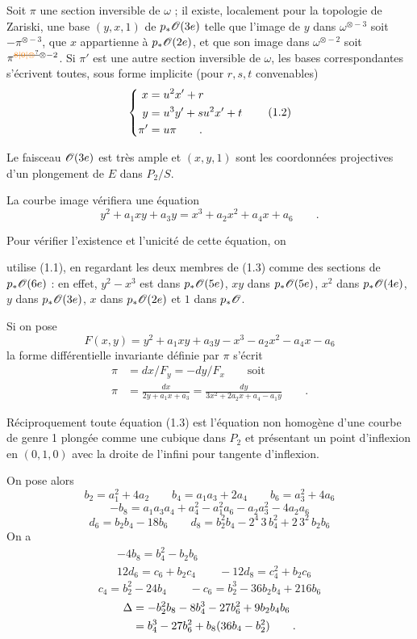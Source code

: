 Soit $\pi$ une section inversible de $\omega$ ; il existe, localement pour la topologie de Zariski, une base $(y,x,1)$ de $p_*\mathscr O(3e)$ telle que l'image de $y$ dans $\omega^{\otimes-3}$ soit $-\pi^{\otimes-3}$, que $x$ appartienne à $p_*\mathscr O(2e)$, et que son image dans $\omega^{\otimes-2}$ soit $\pi^{\deleted{\unsure{8|0|\otimes}}\otimes-2}$. Si $\pi'$ est une autre section inversible de $\omega$, les bases correspondantes s'écrivent toutes, sous forme implicite (pour $r,s,t$ convenables)
\[
\left\{\begin{aligned}
x&=u^2x'+r\\
y&=u^3y'+su^2x'+t\\
\pi'&=u\pi\qquad .
\end{aligned}\right.\tag*{(1.2)}
\]

Le faisceau $\mathscr O(3e)$ est très ample et $(x,y,1)$ sont les coordonnées projectives d'un plongement de $E$ dans $P_2/S$.

La courbe image vérifiera une équation
\[
y^2+a_1xy+a_3y=x^3+a_2x^2+a_4x+a_6\qquad .\tag*{(1.3)}
\]

Pour vérifier l'existence et l'unicité de cette équation, on

utilise (1.1), en regardant les deux membres de (1.3) comme des sections de $p_*\mathscr O(6e)$ : en effet, $y^2-x^3$ est dans $p_*\mathscr O(5e)$, $xy$ dans $p_*\mathscr O(5e)$, $x^2$ dans $p_*\mathscr O(4e)$, $y$ dans $p_*\mathscr O(3e)$, $x$ dans $p_*\mathscr O(2e)$ et $1$ dans $p_*\mathscr O$.

Si on pose
\[
F(x,y)=y^2+a_1xy+a_3y-x^3-a_2x^2-a_4x-a_6
\]
la forme différentielle invariante définie par $\pi$ s'écrit
\[
\begin{aligned}
\pi&=dx/F_y=-dy/F_x\qquad\text{soit}\\
\pi&=\frac{dx}{2y+a_1x+a_3}=\frac{dy}{3x^2+2a_2x+a_4-a_1y}\qquad .
\end{aligned}
\]

Réciproquement toute équation (1.3) est l'équation non homogène d'une courbe de genre 1 plongée comme une cubique dans $P_2$ et présentant un point d'inflexion en $(0,1,0)$ avec la droite de l'infini pour tangente d'inflexion.

On pose alors
\[
b_2=a_1^2+4a_2\qquad b_4=a_1a_3+2a_4\qquad b_6=a_3^2+4a_6\tag*{(1.4)}
\]
\[
-b_8=a_1a_3a_4+a_4^2-a_1^2a_6-a_2a_3^2-4a_2a_6
\]
\[
d_6=b_2b_4-18b_6\qquad d_8=b_2^2b_4-2^4\,3\,b_4^2+2\,3^2\,b_2b_6
\]
On a
\[
\begin{aligned}
&-4b_8=b_4^2-b_2b_6\\
&12d_6=c_6+b_2c_4\qquad -12d_8=c_4^2+b_2c_6
\end{aligned}
\]
\[
c_4=b_2^2-24b_4\qquad -c_6=b_2^3-36b_2b_4+216b_6\tag*{(1.5)}
\]
\[
\begin{aligned}
\Delta&=-b_2^2b_8-8b_4^3-27b_6^2+9b_2b_4b_6\\
&=b_4^3-27b_6^2+b_8(36b_4-b_2^{2})\qquad .
\end{aligned}
\]

